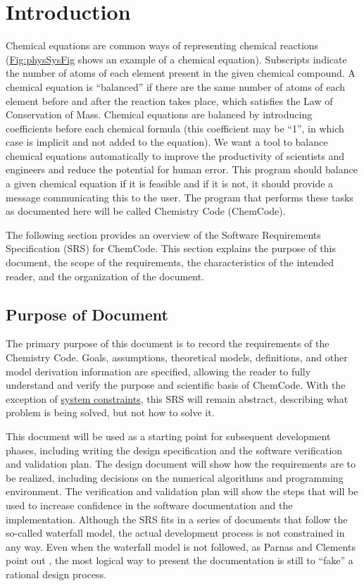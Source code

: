 \documentclass[12pt]{article}
\begin{document}
\section{Introduction}
\label{Sec:Intro}
Chemical equations are common ways of representing chemical reactions (\hyperref[Figure:physSysFig]{Fig:physSysFig} shows an example of a chemical equation). Subscripts indicate the number of atoms of each element present in the given chemical compound. A chemical equation is ``balanced'' if there are the same number of atoms of each element before and after the reaction takes place, which satisfies the Law of Conservation of Mass. Chemical equations are balanced by introducing coefficients before each chemical formula (this coefficient may be ``1'', in which case is implicit and not added to the equation). We want a tool to balance chemical equations automatically to improve the productivity of scientists and engineers and reduce the potential for human error. This program should balance a given chemical equation if it is feasible and if it is not, it should provide a message communicating this to the user. The program that performs these tasks as documented here will be called Chemistry Code (ChemCode).

The following section provides an overview of the Software Requirements Specification (SRS) for ChemCode. This section explains the purpose of this document, the scope of the requirements, the characteristics of the intended reader, and the organization of the document.

\subsection{Purpose of Document}
\label{Sec:DocPurpose}
The primary purpose of this document is to record the requirements of the Chemistry Code. Goals, assumptions, theoretical models, definitions, and other model derivation information are specified, allowing the reader to fully understand and verify the purpose and scientific basis of ChemCode. With the exception of \hyperref[Sec:SysConstraints]{system constraints}, this SRS will remain abstract, describing what problem is being solved, but not how to solve it.

This document will be used as a starting point for subsequent development phases, including writing the design specification and the software verification and validation plan. The design document will show how the requirements are to be realized, including decisions on the numerical algorithms and programming environment. The verification and validation plan will show the steps that will be used to increase confidence in the software documentation and the implementation. Although the SRS fits in a series of documents that follow the so-called waterfall model, the actual development process is not constrained in any way. Even when the waterfall model is not followed, as Parnas and Clements point out \cite{parnasClements1986}, the most logical way to present the documentation is still to ``fake'' a rational design process.
\end{document}
